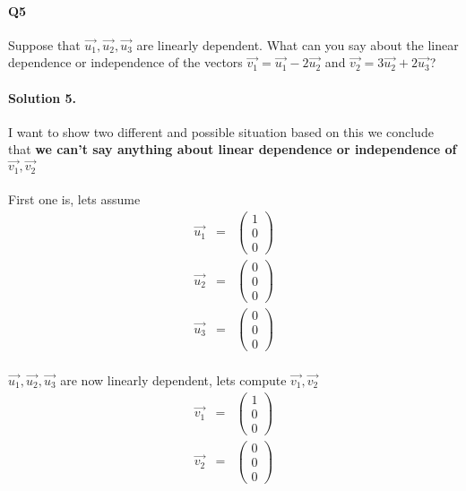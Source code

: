 \documentclass[11pt]{article}
\begin{document}
\paragraph{Q5}Suppose that $\vec{u_1},\vec{u_2},\vec{u_3}$ are linearly dependent. What can you say about the linear dependence or independence of the vectors $\vec{v_1} = \vec{u_1} - 2\vec{u_2}$ and $\vec{v_2} = 3\vec{u_2} + 2\vec{u_3}$?
\paragraph{Solution 5.}I want to show two different and possible situation based on this we conclude that \textbf{we can't say anything about linear dependence or independence of $\vec{v_1}, \vec{v_2}$ }
\paragraph{}First one is, lets assume
\begin{eqnarray*}
\vec{u_1}
&=&
\begin{pmatrix}
1\\
0\\
0
\end{pmatrix}\\
\vec{u_2}
&=&
\begin{pmatrix}
0\\
0\\
0
\end{pmatrix}\\
\vec{u_3}
&=&
\begin{pmatrix}
0\\
0\\
0
\end{pmatrix}
\end{eqnarray*}
\paragraph{}$\vec{u_1},\vec{u_2},\vec{u_3}$ are now linearly dependent, lets compute $\vec{v_1}, \vec{v_2}$
\begin{eqnarray*}
\vec{v_1}
&=&
\begin{pmatrix}
1\\
0\\
0
\end{pmatrix}\\
\vec{v_2}
&=&
\begin{pmatrix}
0\\
0\\
0
\end{pmatrix}
\end{eqnarray*}
\end{document}
